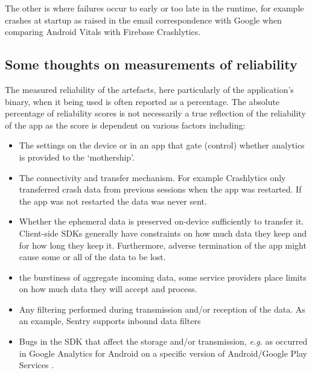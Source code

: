 The other is where failures occur to early or too late in the runtime, for example crashes at startup as raised in the email correspondence with Google when comparing Android Vitals with Firebase Crashlytics.

\subsection{Some thoughts on measurements of reliability}
The measured reliability of the artefacts, here particularly of the application's binary, when it being used is often reported as a percentage. The absolute percentage of reliability scores is not necessarily a true reflection of the reliability of the app as the score is dependent on various factors including:

\begin{itemize}
    \item The settings on the device or in an app that gate (control) whether analytics is provided to the `mothership'.
    \item The connectivity and transfer mechanism. For example Crashlytics only transferred crash data from previous sessions when the app was restarted. If the app was not restarted the data was never sent.
    \item Whether the ephemeral data is preserved on-device sufficiently to transfer it. Client-side SDKs generally have constraints on how much data they keep and for how long they keep it. Furthermore, adverse termination of the app might cause some or all of the data to be lost.
    \item the burstiness of aggregate incoming data, some service providers place limits on how much data they will accept and process. 
    \item Any filtering performed during transmission and/or reception of the data. As an example, Sentry supports inbound data filters~
    \item Bugs in the SDK that affect the storage and/or transmission, \emph{e.g.} as occurred in Google Analytics for Android on a specific version of Android/Google Play Services .

\end{itemize}
